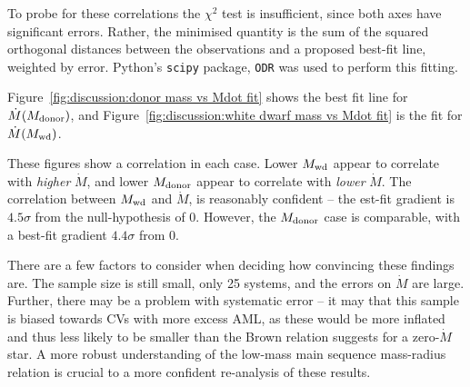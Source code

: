 To probe for these correlations the $\chi^2$ test is insufficient, since both axes have significant errors.
Rather, the minimised quantity is the sum of the squared orthogonal distances between the observations and a proposed best-fit line, weighted by error. Python's \lstinline{scipy} package, \lstinline{ODR} was used to perform this fitting.

Figure~\ref{fig:discussion:donor mass vs Mdot fit} shows the best fit line for $\dot M(M_{\rm donor})$, and Figure~\ref{fig:discussion:white dwarf mass vs Mdot fit} is the fit for $\dot M(M_{\rm wd})$.

These figures show a correlation in each case. Lower $M_{\rm wd}$ appear to correlate with \textit{higher} $\dot M$, and lower $M_{\rm donor}$ appear to correlate with \textit{lower} $\dot M$.
The correlation between $M_{\rm wd}$ and $\dot M$, is reasonably confident -- the est-fit gradient is $4.5\sigma$ from the null-hypothesis of 0.
However, the $M_{\rm donor}$ case is comparable, with a best-fit gradient $4.4 \sigma$ from 0.

There are a few factors to consider when deciding how convincing these findings are.
The sample size is still small, only 25 systems, and the errors on $\dot M$ are large. Further, there may be a problem with systematic error -- it may that this sample is biased towards CVs with more excess AML, as these would be more inflated and thus less likely to be smaller than the Brown relation suggests for a zero-$\dot M$ star.
A more robust understanding of the low-mass main sequence mass-radius relation is crucial to a more confident re-analysis of these results.

